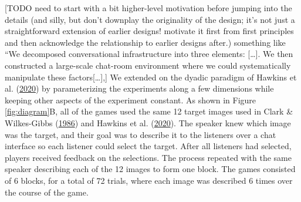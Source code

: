 \documentclass[
  english,
  a4paper,
]{article}
\begin{document}
{[}TODO need to start with a bit higher-level motivation before jumping into the details (and silly, but don't downplay the originality of the design; it's not just a straightforward extension of earlier designs! motivate it first from first principles and then acknowledge the relationship to earlier designs after.) something like ``We decomposed conversational infrastructure into three elements: {[}\ldots{]}. We then constructed a large-scale chat-room environment where we could systematically manipulate these factors{[}\ldots{]},{]}
We extended on the dyadic paradigm of Hawkins et al. (\protect\hyperlink{ref-hawkinsCharacterizingDynamicsLearning2020}{2020}) by parameterizing the experiments along a few dimensions while keeping other aspects of the experiment constant. As shown in Figure \ref{fig:diagram}B, all of the games used the same 12 target images used in Clark \& Wilkes-Gibbs (\protect\hyperlink{ref-clarkReferringCollaborativeProcess1986}{1986}) and Hawkins et al. (\protect\hyperlink{ref-hawkinsCharacterizingDynamicsLearning2020}{2020}). The speaker knew which image was the target, and their goal was to describe it to the listeners over a chat interface so each listener could select the target. After all listeners had selected, players received feedback on the selections. The process repeated with the same speaker describing each of the 12 images to form one block. The games consisted of 6 blocks, for a total of 72 trials, where each image was described 6 times over the course of the game.
\end{document}
